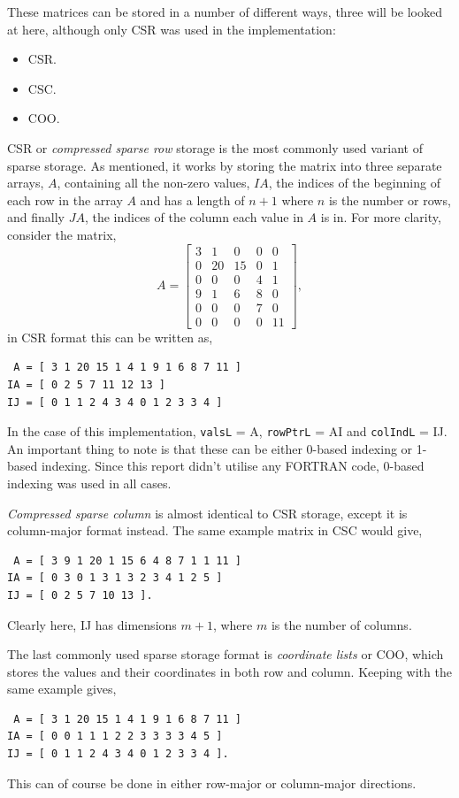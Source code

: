 These matrices can be stored in a number of different ways, three will be looked at here, although only CSR was used in the implementation:
\begin{itemize}
	\item CSR.
	\item CSC.
	\item COO.
\end{itemize}
CSR or \textit{compressed sparse row} storage is the most commonly used variant of sparse storage. As mentioned, it works by storing the matrix into three separate arrays, $A$, containing all the non-zero values, $IA$, the indices of the beginning of each row in the array $A$ and has a length of $n+1$ where $n$ is the number or rows, and finally $JA$, the indices of the column each value in $A$ is in. For more clarity, consider the matrix,
\begin{equation}
	A = 
	\left[\begin{matrix}
		3 & 1 & 0 & 0 & 0\\
		0 & 20 & 15 & 0 & 1\\
		0 & 0 & 0 & 4 & 1\\
		9 & 1 & 6 & 8 & 0\\
		0 & 0 & 0 & 7 & 0\\
		0 & 0 & 0 & 0 & 11
	\end{matrix}\right],
\end{equation}
in CSR format this can be written as,
\begin{lstlisting}
 A = [ 3 1 20 15 1 4 1 9 1 6 8 7 11 ]
IA = [ 0 2 5 7 11 12 13 ]
IJ = [ 0 1 1 2 4 3 4 0 1 2 3 3 4 ]
\end{lstlisting}
In the case of this implementation, \texttt{valsL} = A, \texttt{rowPtrL} = AI and \texttt{colIndL} = IJ. An important thing to note is that these can be either 0-based indexing or 1-based indexing. Since this report didn't utilise any FORTRAN code, 0-based indexing was used in all cases.

\textit{Compressed sparse column} is almost identical to CSR storage, except it is column-major format instead. The same example matrix in CSC would give,
\begin{lstlisting}
 A = [ 3 9 1 20 1 15 6 4 8 7 1 1 11 ]
IA = [ 0 3 0 1 3 1 3 2 3 4 1 2 5 ]
IJ = [ 0 2 5 7 10 13 ].
\end{lstlisting}
Clearly here, IJ has dimensions $m+1$, where $m$ is the number of columns.

The last commonly used sparse storage format is \textit{coordinate lists} or COO, which stores the values and their coordinates in both row and column. Keeping with the same example gives,
\begin{lstlisting}
 A = [ 3 1 20 15 1 4 1 9 1 6 8 7 11 ]
IA = [ 0 0 1 1 1 2 2 3 3 3 3 4 5 ]
IJ = [ 0 1 1 2 4 3 4 0 1 2 3 3 4 ].
\end{lstlisting}
This can of course be done in either row-major or column-major directions.

